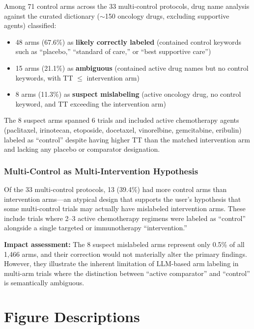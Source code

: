 \documentclass[11pt,a4paper]{article}
\begin{document}
Among 71 control arms across the 33 multi-control protocols, drug name analysis against the curated dictionary ($\sim$150 oncology drugs, excluding supportive agents) classified:
\begin{itemize}
    \item 48 arms (67.6\%) as \textbf{likely correctly labeled} (contained control keywords such as ``placebo,'' ``standard of care,'' or ``best supportive care'')
    \item 15 arms (21.1\%) as \textbf{ambiguous} (contained active drug names but no control keywords, with TT $\leq$ intervention arm)
    \item 8 arms (11.3\%) as \textbf{suspect mislabeling} (active oncology drug, no control keyword, and TT exceeding the intervention arm)
\end{itemize}

The 8 suspect arms spanned 6 trials and included active chemotherapy agents (paclitaxel, irinotecan, etoposide, docetaxel, vinorelbine, gemcitabine, eribulin) labeled as ``control'' despite having higher TT than the matched intervention arm and lacking any placebo or comparator designation.

\subsubsection{Multi-Control as Multi-Intervention Hypothesis}

Of the 33 multi-control protocols, 13 (39.4\%) had more control arms than intervention arms---an atypical design that supports the user's hypothesis that some multi-control trials may actually have mislabeled intervention arms. These include trials where 2--3 active chemotherapy regimens were labeled as ``control'' alongside a single targeted or immunotherapy ``intervention.''

\textbf{Impact assessment:} The 8 suspect mislabeled arms represent only 0.5\% of all 1{,}466 arms, and their correction would not materially alter the primary findings. However, they illustrate the inherent limitation of LLM-based arm labeling in multi-arm trials where the distinction between ``active comparator'' and ``control'' is semantically ambiguous.

\section{Figure Descriptions}
\end{document}

